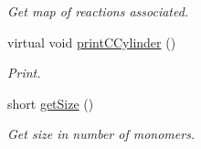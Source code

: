 \begin{DoxyCompactItemize}
\begin{DoxyCompactList}\small\item\em Get map of reactions associated. \end{DoxyCompactList}\item 
virtual void \hyperlink{classCCylinder_a9c358ffc39c2503fc63d67333976bf69}{print\+C\+Cylinder} ()
\begin{DoxyCompactList}\small\item\em Print. \end{DoxyCompactList}\item 
short \hyperlink{classCCylinder_a1e45d32541c9fb3145803cfbf0f93566}{get\+Size} ()
\begin{DoxyCompactList}\small\item\em Get size in number of monomers. \end{DoxyCompactList}\end{DoxyCompactItemize}
{\bf }\par
